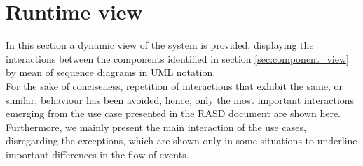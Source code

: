 \section{Runtime view}
In this section a dynamic view of the system is provided, displaying the interactions between the components identified in section \ref{sec:component_view} by mean of sequence diagrams in UML notation.\\
For the sake of conciseness, repetition of interactions that exhibit the same, or similar, behaviour has been avoided, hence, only the most important interactions emerging from the use case presented in the RASD document are shown here. Furthermore, we mainly present the main interaction of the use cases, disregarding the exceptions, which are shown only in some situations to underline important differences in the flow of events.

\pagebreak
